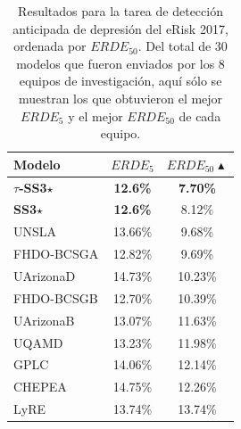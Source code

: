 \begin{table}[t]
\centering
\caption{Resultados para la tarea de detección anticipada de depresión del eRisk 2017, ordenada por $ERDE_{50}$. Del total de 30 modelos que fueron enviados por los 8 equipos de investigación, aquí sólo se muestran los que obtuvieron el mejor $ERDE_{5}$ y el mejor $ERDE_{50}$ de cada equipo.}
\label{tab:results-d2017}
\begin{tabular}{l | c c}
\hline
Modelo & $ERDE_{5}$ & $ERDE_{50}\blacktriangle$ \\ \hline
\textbf{$\tau$-SS3}$\star$ & \textbf{12.6\%} & \textbf{7.70\%}  \\
\textbf{SS3}$\star$ & \textbf{12.6\%} & 8.12\% \\
UNSLA & 13.66\% & 9.68\%  \\
FHDO-BCSGA & 12.82\% & 9.69\% \\
UArizonaD & 14.73\% & 10.23\% \\
FHDO-BCSGB & 12.70\% & 10.39\% \\
UArizonaB & 13.07\% & 11.63\% \\
UQAMD & 13.23\% & 11.98\% \\
GPLC & 14.06\% & 12.14\% \\
CHEPEA & 14.75\% & 12.26\% \\
LyRE & 13.74\% & 13.74\% \\
\hline
\end{tabular}
\end{table}


